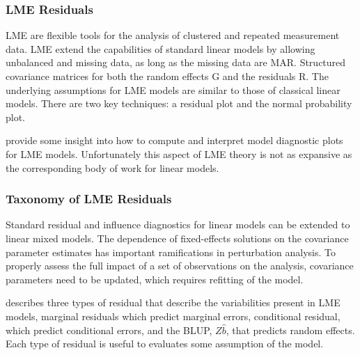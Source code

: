 \documentclass[12pt, a4paper]{report}
\theoremstyle{definition}
\theoremstyle{remark}
\begin{document}
	
	
	
	
%

\subsubsection{LME Residuals}
LME are flexible tools for the analysis of clustered and repeated measurement data. LME extend the capabilities of standard linear models by allowing unbalanced and missing data, as long as the missing data are MAR. Structured covariance matrices for both the random effects G and the residuals R. The underlying assumptions for LME models are similar to those of classical linear models. There are two key techniques: a residual plot and the normal probability plot.

\citet{PB} provide some insight into how to compute and interpret model diagnostic plots for LME models. Unfortunately this aspect of LME theory is not as expansive as the corresponding body of work for linear models.

	\subsubsection{Taxonomy of LME Residuals}
	Standard residual and influence diagnostics for linear models can
	be extended to linear mixed models. The dependence of
	fixed-effects solutions on the covariance parameter estimates has
	important ramifications in perturbation analysis. To properly assess the
	full impact of a set of observations on the analysis, covariance
	parameters need to be updated, which requires refitting of the
	model.
	
\citet{PB} describes three types of residual that describe the variabilities
present in LME models, marginal residuals which predict marginal errors, conditional residual, which predict conditional errors, and the BLUP, $ {Z\hat{b}}$, that predicts random effects.
Each type of residual is useful to evaluates some assumption of the model.
	
\end{document}
